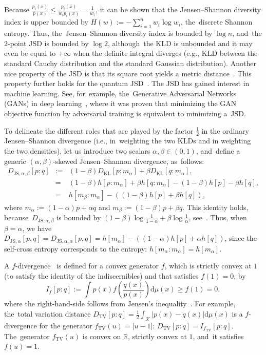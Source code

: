 \documentclass[entropy,article,accept,oneauthor,pdftex,entropy]{Definitions/mdpi}
\def\bbR{\mathbb{R}}
\def\TV{\mathrm{TV}}
\def\JS{\mathrm{JS}}
\def\KL{\mathrm{KL}}
\def\dmu{\mathrm{d}\mu}
\def\calX{\mathcal{X}}
\def\dmu{\mathrm{d}\mu}
\begin{document}
Because $\frac{p_i(x)}{\bar{p}(x)}\leq \frac{p_i(x)}{w_ip_i(x)}=\frac{1}{w_i}$, it can be shown that the Jensen--Shannon diversity index is  upper bounded by $H(w):=-\sum_{i=1}^n w_i\log w_i$, the~discrete Shannon entropy.
Thus, the~Jensen--Shannon diversity index is bounded by $\log n$, and~the  $2$-point JSD is bounded by $\log 2$, although~the KLD is unbounded and it may even be equal to $+\infty$ when the definite integral diverges (e.g., KLD between the standard Cauchy distribution and the standard Gaussian distribution).
Another nice property of the JSD is that its square root yields a metric distance~\cite{JSmetric-2003,JSmetric-2004}.
This property further holds for the quantum JSD~\cite{QuantumJSD-2021}. 
The JSD has gained interest in machine learning.
See, for~example, the~Generative Adversarial Networks~\cite{GAN-2014} (GANs) in deep learning~\cite{DL-2016}, where it was proven that minimizing the GAN objective function by adversarial training is equivalent to minimizing a~JSD.

To delineate the different roles that are played by the factor $\frac{1}{2}$ in the ordinary Jensen--Shannon divergence (i.e., in~weighting the two KLDs and in weighting the two densities), let us introduce two scalars $\alpha,\beta \in (0,1)$, 
and~define a generic $(\alpha,\beta)$-skewed Jensen--Shannon divergence, as~follows:
\begin{eqnarray}
D_{\JS,\alpha,\beta}[p:q]&:=&(1-\beta)D_\KL[p:m_\alpha]+\beta D_\KL[q:m_\alpha],\\
&=& (1-\beta)h[p:m_\alpha]+\beta h[q:m_\alpha]-(1-\beta)h[p]-\beta h[q],\\
&=& h[m_\beta:m_\alpha]-\left((1-\beta)h[p]+\beta h[q]\right),
\end{eqnarray}
where $m_\alpha:=(1-\alpha)p+\alpha q$ and $m_\beta:=(1-\beta)p+\beta q$.
This identity holds, because~$D_{\JS,\alpha,\beta}$ is bounded by $(1-\beta)\log\frac{1}{1-\alpha}+\beta\log\frac{1}{\alpha}$, see~\cite{JScentroid-2020}.
Thus, when $\beta=\alpha$, we have $D_{\JS,\alpha}[p,q]=D_{\JS,\alpha,\alpha}[p,q]=h[m_\alpha]-((1-\alpha)h[p]+\alpha h[q])$, since the self-cross entropy corresponds to the entropy: $h[m_\alpha:m_\alpha]=h[m_\alpha]$.


A $f$-divergence~\cite{fdiv-AliSilvey-1966,EN-PhD-Csiszar-1967,Csiszar-2008} is defined for a convex generator $f$, which is strictly convex at $1$ (to satisfy the identity of the indiscernibles) and that satisfies $f(1)=0$, by~\begin{equation}
I_f[p:q]:=\int p(x) f\left(\frac{q(x)}{p(x)}\right)\dmu(x)\geq f(1)=0,
\end{equation}
where the right-hand-side follows from Jensen's inequality~\cite{Csiszar-2008}.
For example, the~total variation distance $D_\TV[p:q]=\frac{1}{2}\int_\calX |p(x)-q(x)| \dmu(x)$ is a $f$-divergence for the generator $f_\TV(u)=|u-1|$: $D_\TV[p:q]=I_{f_\TV}[p:q]$. The~generator $f_\TV(u)$ is convex on $\bbR$, strictly convex at $1$, and~it satisfies $f(u)=1$.
\end{document}
